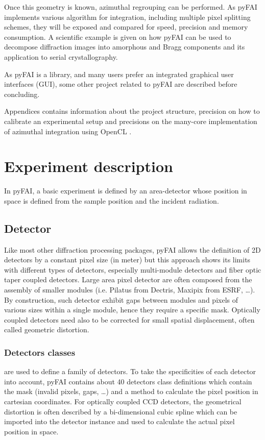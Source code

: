 \documentclass[preprint]{iucr}
\begin{document}
Once this geometry is known, azimuthal regrouping can be performed.
As pyFAI implements various algorithm for integration, including
multiple pixel splitting schemes, they will be exposed and compared
for speed, precision and memory consumption.
A scientific example is given on how pyFAI can be used to decompose
diffraction images into amorphous and Bragg components and its application
to serial crystallography.

As pyFAI is a library, and many users prefer an integrated graphical user
interfaces (GUI), some other project related to pyFAI are described before
concluding.

Appendices contains information about the project structure, precision
on how to calibrate an experimental setup and precisions on the many-core
implementation of azimuthal integration using OpenCL \cite{opencl}.

\section{Experiment description}
In pyFAI, a basic experiment is defined by an area-detector whose position
in space is defined from the sample position and the incident radiation.

\subsection{Detector}
Like most other diffraction processing packages, pyFAI allows the definition of
2D detectors by a constant pixel size (in meter) but this approach shows its limits
with different types of detectors, especially multi-module detectors and fiber
optic taper coupled detectors. Large area pixel detector are often composed from
the assembly of smaller modules (i.e. Pilatus from Dectris, Maxipix from ESRF,
\ldots).
By construction, such detector exhibit gaps between modules and pixels of
various sizes within a single module, hence they require a specific mask.
Optically coupled detectors need also to be corrected
for small spatial displacement, often called geometric distortion.

\subsubsection{Detectors classes} are used to define a family of detectors.
To take the specificities of each detector into account, pyFAI contains about
40 detectors class definitions which contain the mask (invalid pixels,
gaps, \ldots) and a method to calculate the pixel position in cartesian coordinates.
For optically coupled CCD detectors, the geometrical distortion is often
described by a bi-dimensional cubic spline which can be imported into
the detector instance and used to calculate the actual pixel position in space.
\end{document}
